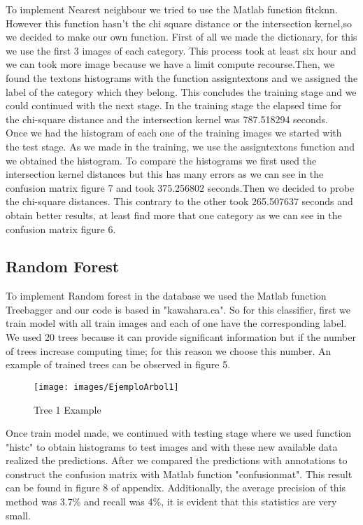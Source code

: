 \documentclass[10pt,twocolumn,letterpaper]{article}
\begin{document}
To implement Nearest neighbour we tried to use the Matlab function fitcknn. However this function hasn't the chi square distance or the intersection kernel,so we decided to make our own function. First of all we made the dictionary, for this we use the first 3 images of each category. This process took at least six hour and we can took more image because we have a limit compute recourse.Then, we found the textons histograms with the function assigntextons and we assigned the label of the category which they belong. This concludes the training stage and we could continued with the next stage. In the training stage the elapsed time for the chi-square distance and the intersection kernel was 787.518294 seconds.\\

Once we had the histogram of each one of the training images we started with the test stage. As we made in the training, we use the assigntextons function and we obtained the histogram. To compare the histograms we first used the intersection kernel distances but this has many errors as we can see in the confusion matrix figure 7  and took 375.256802 seconds.Then we decided to probe the chi-square distances. This contrary to the other took 265.507637 seconds and obtain better results, at least find more that one category as we can see in the confusion matrix figure 6.   

\subsection{Random Forest}


To implement Random forest in the database we used the Matlab function Treebagger and our code is based in "kawahara.ca". So for this classifier, first we train model with all train images and each of one have the corresponding label. We used 20 trees because it can provide significant information but if the number of trees increase computing time; for this reason we choose this number. An example of trained trees can be observed in figure 5. 

\begin{figure}[H] \centering \texttt{[image: images/EjemploArbol1]}\caption{Tree 1 Example }\label{Comp}\end{figure}


Once train model made, we continued with testing stage where we used function "histc"  to obtain histograms to test images and with these new available data realized the predictions. After we compared the predictions with annotations to construct the confusion matrix with Matlab function "confusionmat". This result can be found in figure 8 of appendix. Additionally, the average precision of this method was 3.7\% and recall was 4\%, it is evident that this statistics are very small. 
\end{document}
